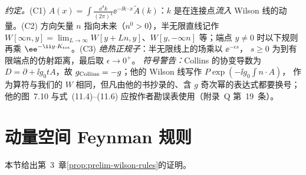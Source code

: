 \emph{约定。}(C1) $A(x)=\int\frac{\dd^4k}{(2\pi)^4}\ee^{-\ii k\cdot x}\tilde A(k)$：$k$ 是在连接点\emph{流入} Wilson 线的动量。(C2) 方向矢量 $n$ 指向未来（$n^0>0$），半无限直线记作
$W[\infty n,y]=\lim_{L\to\infty}W[y+Ln,y]$、$W[y,-\infty n]$ 等；端点 $y\ne0$ 时以下规则再乘 $\ee^{-\ii y\cdot K_{\rm tot}}$。(C3) \emph{绝热正规子}：半无限线上的场乘以 $\ee^{-\epsilon s}$，
$s\ge0$ 为到有限端点的仿射距离，最后取 $\epsilon\to0^+$。
\emph{符号警告：}Collins 的协变导数为 $D=\partial+\ii g_0tA$\cite[式~(2.2)]{Collins2011}，故 $g_{\rm Collins}=-g$；他的 Wilson 线写作 $P\exp(-\ii g_0\int n\cdot A)$\cite[式~(13.40)]{Collins2011}，
作为算符与我们的 $W$ 相同，但凡由他的书抄录的、含 $g$ 奇次幂的表达式都要换号；他的图~7.10 与式~(11.4)--(11.6) 应按作者勘误表使用（附录~Q 第~19~条）。

\section{动量空间 Feynman 规则}\label{sec:appB-rules}

本节给出第~3~章\cref{prop:prelim-wilson-rules}的证明。

